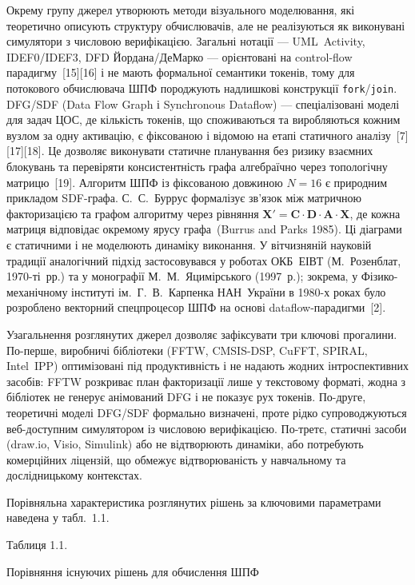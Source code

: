 Окрему групу джерел утворюють методи візуального моделювання, які
теоретично описують структуру обчислювачів, але не реалізуються як
виконувані симулятори з числовою верифікацією. Загальні нотації ---
UML~Activity, IDEF0/IDEF3, DFD Йордана/ДеМарко --- орієнтовані на
control-flow парадигму~{[}15{]}{[}16{]} і не мають формальної семантики
токенів, тому для потокового обчислювача ШПФ породжують надлишкові
конструкції \texttt{fork}/\texttt{join}. DFG/SDF (Data Flow Graph і
Synchronous Dataflow) --- спеціалізовані моделі для задач ЦОС, де
кількість токенів, що споживаються та виробляються кожним вузлом за одну
активацію, є фіксованою і відомою на етапі статичного аналізу~{[}7{]}{[}17{]}{[}18{]}.
Це дозволяє виконувати статичне планування без ризику взаємних блокувань
та перевіряти консистентність графа алгебраїчно через топологічну
матрицю~{[}19{]}. Алгоритм ШПФ із фіксованою довжиною \(N = 16\) є
природним прикладом SDF-графа. С.~С.~Буррус формалізує зв'язок між
матричною факторизацією та графом алгоритму через рівняння
\(\mathbf{X}' = \mathbf{C} \cdot \mathbf{D} \cdot \mathbf{A} \cdot
\mathbf{X}\), де кожна матриця відповідає окремому ярусу графа~(Burrus
and Parks 1985). Ці діаграми є статичними і не моделюють динаміку
виконання. У вітчизняній науковій традиції аналогічний підхід
застосовувався у роботах ОКБ~ЕІВТ (М.~Розенблат, 1970-ті~рр.) та у
монографії М.~М.~Яцимірського (1997~р.); зокрема, у
Фізико-механічному інституті ім.~Г.~В.~Карпенка НАН~України в 1980-х
роках було розроблено векторний спецпроцесор ШПФ на основі
dataflow-парадигми~{[}2{]}.

Узагальнення розглянутих джерел дозволяє зафіксувати три ключові
прогалини. По-перше, виробничі бібліотеки (FFTW, CMSIS-DSP, CuFFT,
SPIRAL, Intel~IPP) оптимізовані під продуктивність і не надають жодних
інтроспективних засобів: FFTW розкриває план факторизації лише у
текстовому форматі, жодна з бібліотек не генерує анімований DFG і не
показує рух токенів. По-друге, теоретичні моделі DFG/SDF формально
визначені, проте рідко супроводжуються веб-доступним симулятором із
числовою верифікацією. По-третє, статичні засоби (draw.io, Visio,
Simulink) або не відтворюють динаміки, або потребують комерційних
ліцензій, що обмежує відтворюваність у навчальному та дослідницькому
контекстах.

Порівняльна характеристика розглянутих рішень за ключовими
параметрами наведена у табл.~1.1.

Таблиця 1.1.

Порівняння існуючих рішень для обчислення ШПФ

